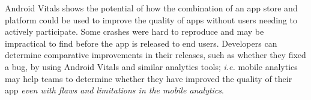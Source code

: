\begin{SingleSpace}
Android Vitals shows the potential of how the combination of an app store and platform could be used to improve the quality of apps without users needing to actively participate. Some crashes were hard to reproduce and may be impractical to find before the app is released to end users. Developers can determine comparative improvements in their releases, such as whether they fixed a bug, by using Android Vitals and similar analytics tools; \textit{i.e.} mobile analytics may help teams to determine whether they have improved the quality of their app \textit{even with flaws and limitations in the mobile analytics}.
\end{SingleSpace}
\newpage

